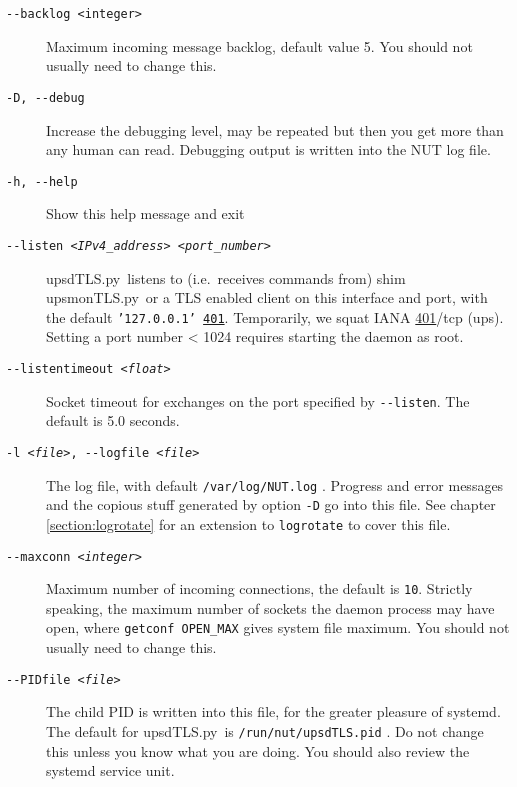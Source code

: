 \documentclass[12pt]{article}
\newcommand{\upsdTLS}{\mbox{\textcolor{UPSDCOLOUR}{upsdTLS.py}}}
\newcommand{\upsmonTLS}{\mbox{\textcolor{UPSMONCOLOUR}{upsmonTLS.py}}}
\newcommand{\IANAups}{\href{https://www.iana.org/assignments/service-names-port-numbers/service-names-port-numbers.xhtml?search=401}%
                           {401}}
\begin{document}
\begin{description}

\item[\texttt{-\/-backlog <integer>}] Maximum incoming message
  backlog, default value 5.  You should not usually need to change
  this.

\item[\texttt{-D, -\/-debug}] Increase the debugging level, may be
  repeated but then you get more than any human can read.  Debugging
  output is written into the NUT log file.

\item[\texttt{-h, -\/-help}]  Show this help message and exit

\item[\texttt{-\/-listen \textit{<IPv4\_address>}
    \textit{<port\_number>}}] \upsdTLS\ listens to (i.e.\ receives
  commands from) shim \upsmonTLS\ or a TLS enabled client on this
  interface and port, with the default \texttt{'127.0.0.1'
    \IANAups}. Temporarily, we squat IANA \IANAups/tcp (ups). Setting
  a port number < 1024 requires starting the daemon as root.

\item[\texttt{-\/-listentimeout \textit{<float>}}] Socket timeout for
  exchanges on the port specified by \texttt{-\/-listen}.  The default
  is 5.0 seconds.

\item[\texttt{-l \textit{<file>}, -\/-logfile \textit{<file>}}] The
  log file, with default \texttt{/var/log/NUT.log} . Progress and
  error messages and the copious stuff generated by option \texttt{-D}
  go into this file.  See chapter \ref{section:logrotate} for an
  extension to \texttt{logrotate} to cover this file.

\item[\texttt{-\/-maxconn \textit{<integer>}}] Maximum number of
  incoming connections, the default is \texttt{10}.  Strictly
  speaking, the maximum number of sockets the daemon process may have
  open, where \texttt{getconf OPEN\_MAX} gives system file maximum.
  You should not usually need to change this.

\item[\texttt{-\/-PIDfile \textit{<file>}}] The child PID is written
  into this file, for the greater pleasure of systemd.  The default
  for \upsdTLS\ is \texttt{/run/nut/{\allowbreak}upsdTLS.pid} . Do not
  change this unless you know what you are doing.  You should also
  review the systemd service unit.


\end{description}
\end{document}
